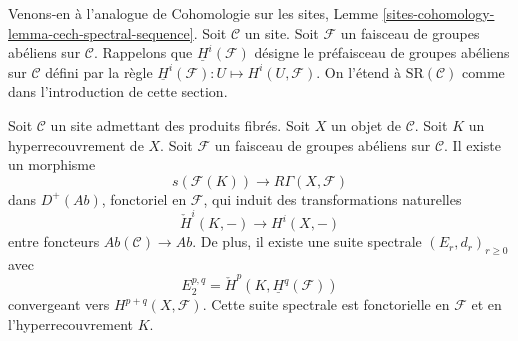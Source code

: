\noindent
Venons-en à l'analogue de Cohomologie sur les sites, Lemme
\ref{sites-cohomology-lemma-cech-spectral-sequence}.
Soit $\mathcal{C}$ un site.
Soit $\mathcal{F}$ un faisceau de groupes abéliens sur $\mathcal{C}$.
Rappelons que $\underline{H}^i(\mathcal{F})$ désigne le préfaisceau
de groupes abéliens sur $\mathcal{C}$ défini par la
règle $\underline{H}^i(\mathcal{F}) : U \longmapsto H^i(U, \mathcal{F})$.
On l'étend à $\text{SR}(\mathcal{C})$ comme dans l'introduction
de cette section.

\begin{lemma}
\label{lemma-cech-spectral-sequence}
Soit $\mathcal{C}$ un site admettant des produits fibrés.
Soit $X$ un objet de $\mathcal{C}$.
Soit $K$ un hyperrecouvrement de $X$.
Soit $\mathcal{F}$ un faisceau de groupes abéliens sur $\mathcal{C}$.
Il existe un morphisme
$$
s(\mathcal{F}(K))
\longrightarrow
R\Gamma(X, \mathcal{F})
$$
dans $D^{+}(\textit{Ab})$, fonctoriel en $\mathcal{F}$, qui induit
des transformations naturelles
$$
\check{H}^i(K, -) \longrightarrow H^i(X, -)
$$
entre foncteurs $\textit{Ab}(\mathcal{C}) \to \textit{Ab}$. De plus,
il existe une suite spectrale $(E_r, d_r)_{r \geq 0}$ avec
$$
E_2^{p, q} = \check{H}^p(K, \underline{H}^q(\mathcal{F}))
$$
convergeant vers $H^{p + q}(X, \mathcal{F})$.
Cette suite spectrale est fonctorielle en $\mathcal{F}$ et
en l'hyperrecouvrement $K$.
\end{lemma}

